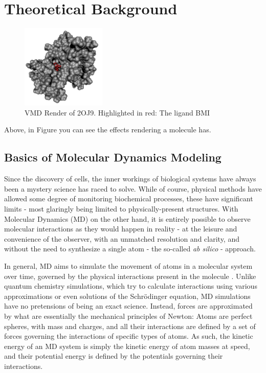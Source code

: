 \documentclass[oneside]{scrreprt}
\begin{document}
\section{Theoretical Background}



\begin{figure}[h]
\centering
 \includegraphics[height=4cm]{2oj9_render_complex.png} 

\caption{VMD Render of 2OJ9. Highlighted in red: The ligand BMI}
\label{fig:vmdrender}
\end{figure}
Above, in Figure  you can see the effects rendering a molecule has.


\subsection{Basics of Molecular Dynamics Modeling}

Since the discovery of cells, the inner workings of biological systems have always been a mystery science has raced to solve. While of course, physical methods have allowed some degree of monitoring biochemical processes, these have significant limits - most glaringly being limited to physically-present structures. With Molecular Dynamics (MD) on the other hand, it is entirely possible to observe molecular interactions as they would happen in reality - at the leisure and convenience of the observer, with an unmatched resolution and clarity, and without the need to synthesize a single atom - the so-called \emph{ab silico} - approach.

In general, MD aims to simulate the movement of atoms in a molecular system over time, governed by the physical interactions present in the molecule \supercite{Hollingsworth2018Sep}. Unlike quantum chemistry simulations, which try to calculate interactions using various approximations or even solutions of the Schrödinger equation, MD simulations have no pretensions of being an exact science. Instead, forces are approximated by what are essentially the mechanical principles of Newton: Atoms are perfect spheres, with mass and charges, and all their interactions are defined by a set of forces governing the interactions of specific types of atoms. As such, the kinetic energy of an MD system is simply the kinetic energy of atom masses at speed, and their potential energy is defined by the potentials governing their interactions.
\end{document}
